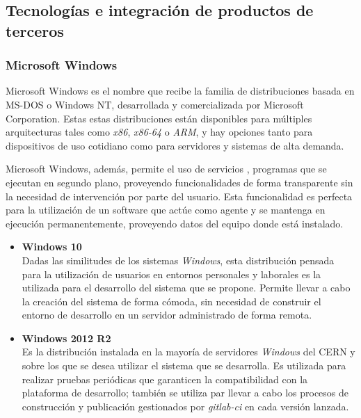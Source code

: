     \subsection{Tecnologías e integración de productos de terceros}
        \subsubsection{Microsoft Windows}
            Microsoft Windows es el nombre que recibe la familia de distribuciones basada en MS-DOS o Windows NT, desarrollada y comercializada por Microsoft Corporation. Estas estas distribuciones están disponibles para múltiples arquitecturas tales como \textit{x86}, \textit{x86-64} o \textit{ARM}, y hay opciones tanto para dispositivos de uso cotidiano como para servidores y sistemas de alta demanda. \cite{wikiwindows}
            
            Microsoft Windows, además, permite el uso de servicios \cite{wikiservicios}, programas que se ejecutan en segundo plano, proveyendo funcionalidades de forma transparente sin la necesidad de intervención por parte del usuario. Esta funcionalidad es perfecta para la utilización de un software que actúe como agente y se mantenga en ejecución permanentemente, proveyendo datos del equipo donde está instalado.
            
            \begin{itemize}
                \item \textbf{Windows 10} \\
                Dadas las similitudes de los sistemas \textit{Windows}, esta distribución pensada para la utilización de usuarios en entornos personales y laborales es la utilizada para el desarrollo del sistema que se propone. Permite llevar a cabo la creación del sistema de forma cómoda, sin necesidad de construir el entorno de desarrollo en un servidor administrado de forma remota.
                
                \item \textbf{Windows 2012 R2} \\
                Es la distribución instalada en la mayoría de servidores \textit{Windows} del CERN y sobre los que se desea utilizar el sistema que se desarrolla. Es utilizada para realizar pruebas periódicas que garanticen la compatibilidad con la plataforma de desarrollo; también se utiliza par llevar a cabo los procesos de construcción y publicación gestionados por \textit{gitlab-ci} en cada versión lanzada.
                
            \end{itemize}

